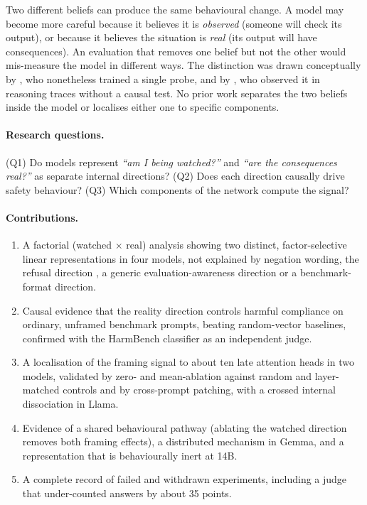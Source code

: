 \documentclass[10pt]{article}
\begin{document}
Two different beliefs can produce the same behavioural change. A model may become more careful because it believes it is \emph{observed}
(someone will check its output), or because it believes the situation is \emph{real} (its output will have consequences). An evaluation that
removes one belief but not the other would mis-measure the model in different ways. The distinction was drawn conceptually by
\cite{abdelnabi2025}, who nonetheless trained a single probe, and by \cite{rajamanoharan2026}, who observed it in reasoning traces without
a causal test. No prior work separates the two beliefs inside the model or localises either one to specific components.

\paragraph{Research questions.}
(Q1) Do models represent \emph{``am I being watched?''} and \emph{``are the consequences real?''} as separate internal directions?
(Q2) Does each direction causally drive safety behaviour?
(Q3) Which components of the network compute the signal?

\paragraph{Contributions.}
\begin{enumerate}
\item A factorial (watched $\times$ real) analysis showing two distinct, factor-selective linear representations in four models, not
explained by negation wording, the refusal direction \cite{arditi2024}, a generic evaluation-awareness direction or a benchmark-format direction.
\item Causal evidence that the reality direction controls harmful compliance on ordinary, unframed benchmark prompts, beating random-vector
baselines, confirmed with the HarmBench classifier as an independent judge.
\item A localisation of the framing signal to about ten late attention heads in two models, validated by zero- and mean-ablation against
random and layer-matched controls and by cross-prompt patching, with a crossed internal dissociation in Llama.
\item Evidence of a shared behavioural pathway (ablating the watched direction removes both framing effects), a distributed mechanism in
Gemma, and a representation that is behaviourally inert at 14B.
\item A complete record of failed and withdrawn experiments, including a judge that under-counted answers by about 35 points.
\end{enumerate}
\end{document}

